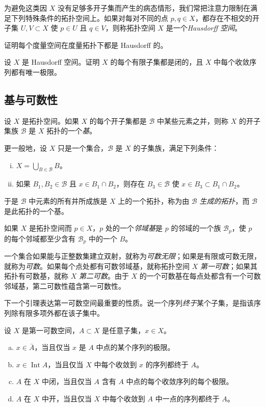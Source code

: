 \documentclass[../../main.tex]{subfiles}
\begin{document}
为避免这类因 $X$ 没有足够多开子集而产生的病态情形，我们常把注意力限制在满足下列特殊条件的拓扑空间上。如果对每对不同的点 $p,q\in X$，都存在不相交的开子集 $U,V\subset X$ 使 $p\in U$ 且 $q\in V$，则称拓扑空间 $X$ 是一个\emph{Hausdorff 空间}。

\begin{exercise}\label{exercise:appA-A-10}
证明每个度量空间在度量拓扑下都是 Hausdorff 的。
\end{exercise}

\begin{exercise}\label{exercise:appA-A-11}
设 $X$ 是 Hausdorff 空间。证明 $X$ 的每个有限子集都是闭的，且 $X$ 中每个收敛序列都有唯一极限。
\end{exercise}

\subsection*{基与可数性}

设 $X$ 是拓扑空间。如果 $X$ 的每个开子集都是 $\mathcal B$ 中某些元素之并，则称 $X$ 的开子集族 $\mathcal B$ 是 $X$ 拓扑的一个\emph{基}。

更一般地，设 $X$ 只是一个集合，$\mathcal B$ 是 $X$ 的子集族，满足下列条件：
\begin{enumerate}[(i)]
\item $X=\bigcup_{B\in\mathcal B}B$。
\item 如果 $B_1,B_2\in\mathcal B$ 且 $x\in B_1\cap B_2$，则存在 $B_3\in\mathcal B$ 使 $x\in B_3\subset B_1\cap B_2$。
\end{enumerate}
于是 $\mathcal B$ 中元素的所有并所成族是 $X$ 上的一个拓扑，称为由 $\mathcal B$ \emph{生成的拓扑}，而 $\mathcal B$ 是此拓扑的一个基。

如果 $X$ 是拓扑空间而 $p\in X$，$p$ 处的一个\emph{邻域基}是 $p$ 的邻域的一个族 $\mathcal B_p$，使 $p$ 的每个邻域都至少含有 $\mathcal B_p$ 中的一个 $B$。

一个集合如果能与正整数集建立双射，就称为\emph{可数无限}；如果是有限或可数无限，就称为\emph{可数}。如果每个点处都有可数邻域基，就称拓扑空间 $X$ \emph{第一可数}；如果其拓扑有可数基，就称 $X$ \emph{第二可数}。由于 $X$ 的一个可数基在每点处都含有一个可数邻域基，第二可数性蕴含第一可数性。

下一个引理表达第一可数空间最重要的性质。说一个序列\emph{终于}某个子集，是指该序列除有限多项外都在该子集中。

\begin{lemma}[序列引理]\label{lemma:appA-sequence-lemma}
设 $X$ 是第一可数空间，$A\subset X$ 是任意子集，$x\in X$。
\begin{enumerate}[(a)]
\item $x\in\bar A$，当且仅当 $x$ 是 $A$ 中点的某个序列的极限。
\item $x\in\operatorname{Int}A$，当且仅当 $X$ 中每个收敛到 $x$ 的序列都终于 $A$。
\item $A$ 在 $X$ 中闭，当且仅当 $A$ 含有 $A$ 中点的每个收敛序列的每个极限。
\item $A$ 在 $X$ 中开，当且仅当 $X$ 中每个收敛到 $A$ 中一点的序列都终于 $A$。
\end{enumerate}
\end{lemma}
\end{document}
